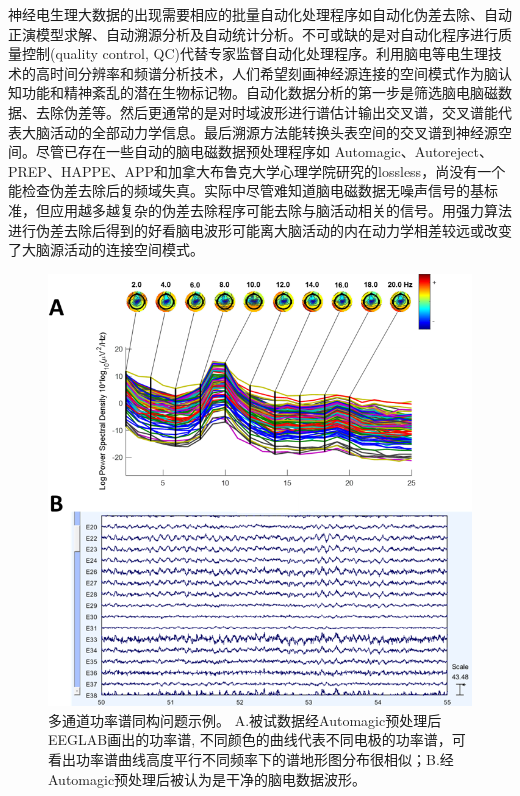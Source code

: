 神经电生理大数据的出现需要相应的批量自动化处理程序如自动化伪差去除、自动正演模型求解、自动溯源分析及自动统计分析。不可或缺的是对自动化程序进行质量控制(quality control, QC)代替专家监督自动化处理程序。利用脑电等电生理技术的高时间分辨率和频谱分析技术，人们希望刻画神经源连接的空间模式作为脑认知功能和精神紊乱的潜在生物标记物。自动化数据分析的第一步是筛选脑电脑磁数据、去除伪差等。然后更通常的是对时域波形进行谱估计输出交叉谱，交叉谱能代表大脑活动的全部动力学信息。最后溯源方法能转换头表空间的交叉谱到神经源空间。尽管已存在一些自动的脑电磁数据预处理程序如
Automagic、Autoreject、PREP、HAPPE、APP和加拿大布鲁克大学心理学院研究的lossless，尚没有一个能检查伪差去除后的频域失真。实际中尽管难知道脑电磁数据无噪声信号的基标准，但应用越多越复杂的伪差去除程序可能去除与脑活动相关的信号。用强力算法进行伪差去除后得到的好看脑电波形可能离大脑活动的内在动力学相差较远或改变了大脑源活动的连接空间模式。
\begin{figure}[!h]
\includegraphics[width=15cm]{pic/palos/issue.png}
\caption{多通道功率谱同构问题示例。 A.被试数据经Automagic预处理后EEGLAB画出的功率谱, 不同颜色的曲线代表不同电极的功率谱，可看出功率谱曲线高度平行不同频率下的谱地形图分布很相似；B.经Automagic预处理后被认为是干净的脑电数据波形。}
\label{5:issue}
\end{figure}

